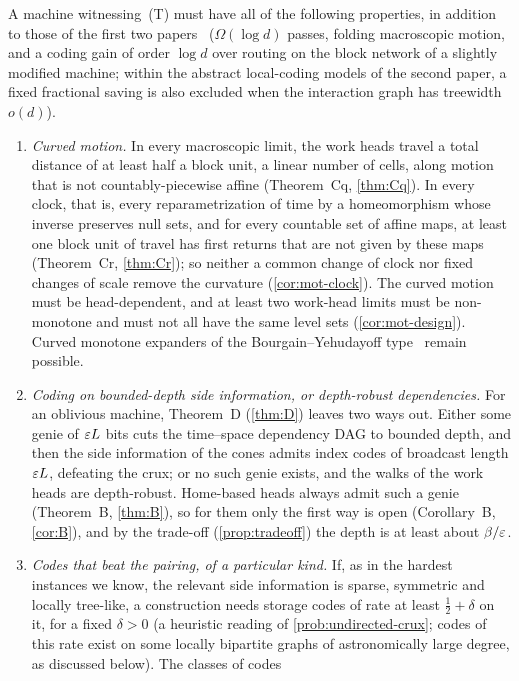 A machine witnessing~(T) must have all of the following properties, in addition to those of the first two
papers~\cite{FirstPaper2026,SecondPaper2026} ($\Omega(\log d)$ passes, folding macroscopic motion, and a coding gain of order
$\log d$ over routing on the block network of a slightly modified machine; within the abstract local-coding models of
the second paper, a fixed fractional saving is also excluded when the interaction graph has treewidth $o(d)$).
\begin{enumerate}[label=(C\arabic*),leftmargin=3em]
\item \emph{Curved motion.} In every macroscopic limit, the work heads travel a total distance of at least
half a block unit, a linear number of cells, along motion that is not countably-piecewise affine (Theorem~Cq,
\cref{thm:Cq}). In every clock, that is, every reparametrization of time by a homeomorphism whose inverse preserves null
sets, and for every countable set of affine maps, at least one block unit of travel has first returns that are not given
by these maps (Theorem~Cr, \cref{thm:Cr}); so neither a common change of clock nor fixed changes of scale remove the
curvature (\cref{cor:mot-clock}). The curved motion must be head-dependent, and
at least two work-head limits must be non-monotone and must not all have the same level sets (\cref{cor:mot-design}). Curved monotone expanders of the Bourgain--Yehudayoff type~\cite{BourgainYehudayoff2013} remain
possible.
\item \emph{Coding on bounded-depth side information, or depth-robust dependencies.} For an oblivious machine, Theorem~D
(\cref{thm:D}) leaves two ways out. Either some genie of $\varepsilon L$ bits cuts the time--space dependency DAG to bounded
depth, and then the side information of the cones admits index codes of broadcast length $\varepsilon L$, defeating the crux;
or no such genie exists, and the walks of the work heads are depth-robust. Home-based heads always admit such a genie
(Theorem~B, \cref{thm:B}), so for them only the first way is open (Corollary~B, \cref{cor:B}), and by the trade-off
(\cref{prop:tradeoff}) the depth is at least about $\beta/\varepsilon$.
\item \emph{Codes that beat the pairing, of a particular kind.} If, as in the hardest instances we know, the relevant side
information is sparse, symmetric and locally tree-like, a construction needs storage codes of rate at least
$\tfrac12+\delta$ on it, for a fixed $\delta>0$ (a heuristic reading of \cref{prob:undirected-crux}; codes of this rate
exist on some locally bipartite graphs of astronomically large degree, as discussed below). The classes of codes

\end{enumerate}
